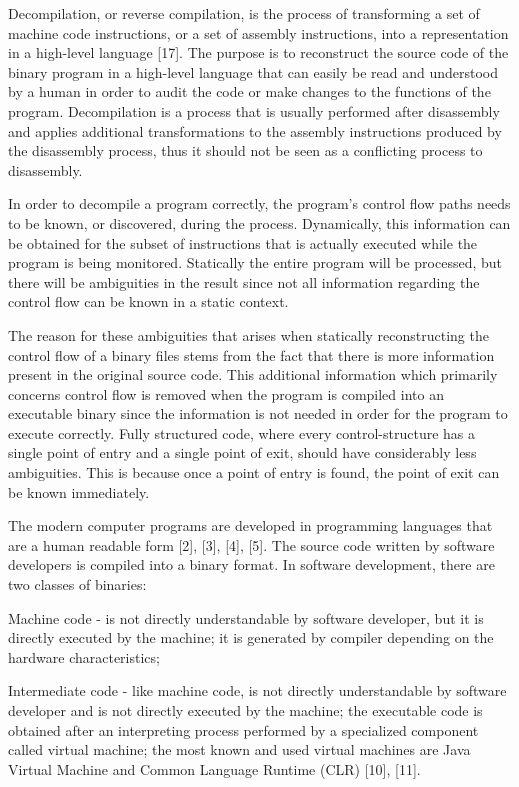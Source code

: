 Decompilation, or reverse compilation, is the process of transforming a set of machine code instructions, or a set of assembly instructions, into a representation in a high-level language [17]. The purpose is to reconstruct the source code of the binary program in a high-level language that can easily be read and understood by a human in order to audit the code or make changes to the functions of the program. Decompilation is a process that is usually performed after disassembly and applies additional transformations to the assembly instructions produced by the disassembly process, thus it should not be seen as a conflicting process to disassembly.

In order to decompile a program correctly, the program’s control flow paths needs to be known, or discovered, during the process. Dynamically, this information can be obtained for the subset of instructions that is actually executed while the program is being monitored. Statically the entire program will be processed, but there will be ambiguities in the result since not all information
regarding the control flow can be known in a static context.

The reason for these ambiguities that arises when statically reconstructing the control flow of a binary files stems from the fact that there is more information present in the original source code. This additional information which primarily concerns control flow is removed when the program is compiled into an executable binary since the information is not needed in order for the program to execute correctly. Fully structured code, where every control-structure has a single point of entry and a single point of exit, should have considerably less ambiguities. This is because once a point of entry is found, the point of exit can be known immediately.

The modern computer programs are developed in programming languages that
are a human readable form [2], [3], [4], [5]. The source code written by software
developers is compiled into a binary format. In software development, there
are two classes of binaries: 

Machine code - is not directly understandable by software developer,
but it is directly executed by the machine; it is generated by compiler depending on the hardware
characteristics; 

Intermediate code - like machine code, is not directly understandable by
software developer and is not directly executed by the machine; the executable code is obtained after an interpreting process performed by a specialized component called virtual
machine; the most known and used virtual machines are Java Virtual Machine and Common Language
Runtime (CLR) [10], [11].

